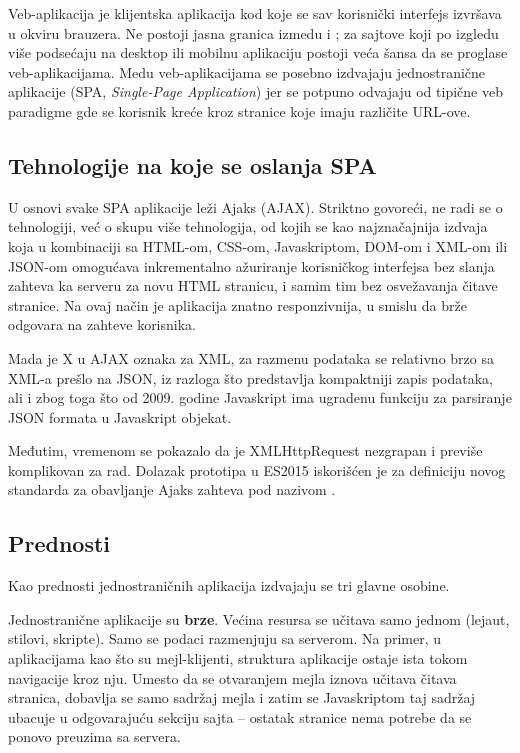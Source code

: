 Veb-aplikacija je klijentska aplikacija kod koje se sav korisnički interfejs izvršava u okviru brauzera.
Ne postoji jasna granica izmedu  i ; za sajtove koji po izgledu više podsećaju na desktop ili mobilnu aplikaciju postoji veća šansa da se proglase veb-aplikacijama.
Medu veb-aplikacijama se posebno izdvajaju jednostranične aplikacije (SPA, \textsl{Single-Page Application}) jer se potpuno odvajaju od tipične veb paradigme gde se korisnik kreće kroz stranice koje imaju različite URL-ove.

\subsection{Tehnologije na koje se oslanja SPA}

U osnovi svake SPA aplikacije leži Ajaks (AJAX).
Striktno govoreći, ne radi se o tehnologiji, već o skupu više tehnologija, od kojih se kao najznačajnija izdvaja  koja u kombinaciji sa HTML-om, CSS-om, Javaskriptom, DOM-om i XML-om ili JSON-om omogućava inkrementalno ažuriranje korisničkog interfejsa bez slanja zahteva ka serveru za novu HTML stranicu, i samim tim bez osvežavanja čitave stranice.
Na ovaj način je aplikacija znatno responzivnija, u smislu da brže odgovara na zahteve korisnika.

Mada je X u AJAX oznaka za XML, za razmenu podataka se relativno brzo sa XML-a prešlo na JSON, iz razloga što predstavlja kompaktniji zapis podataka, ali
i zbog toga što od 2009. godine Javaskript ima ugradenu funkciju za parsiranje JSON formata u Javaskript objekat.

Međutim, vremenom se pokazalo da je XMLHttpRequest nezgrapan i previše komplikovan za rad.
Dolazak prototipa  u ES2015 iskorišćen je za definiciju novog standarda za obavljanje Ajaks zahteva pod nazivom .

\subsection{Prednosti}

Kao prednosti jednostraničnih aplikacija izdvajaju se tri glavne osobine.

Jednostranične aplikacije su \textbf{brze}.
Većina resursa se učitava samo jednom (lejaut, stilovi, skripte).
Samo se podaci razmenjuju sa serverom.
Na primer, u aplikacijama kao što su mejl-klijenti, struktura aplikacije ostaje ista tokom navigacije kroz nju.
Umesto da se otvaranjem mejla iznova učitava čitava stranica, dobavlja se samo sadržaj mejla i zatim se Javaskriptom taj sadržaj ubacuje u odgovarajuću sekciju sajta -- ostatak stranice nema potrebe da se ponovo preuzima sa servera.

